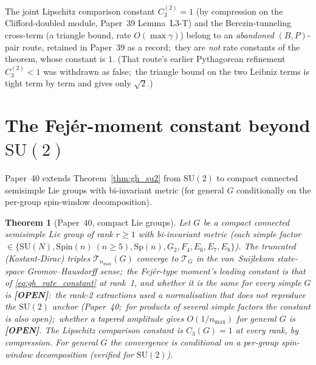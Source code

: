 \documentclass[11pt,a4paper]{article}
\theoremstyle{plain}
\newtheorem{theorem}{Theorem}[section]
\theoremstyle{definition}
\newcommand{\nmax}{n_{\max}}
\newcommand{\Tcal}{\mathcal{T}}
\newcommand{\SU}{\mathrm{SU}}
\newcommand{\gvc}[2]{#2}
\begin{document}
\gvc{lipschitz-c3-compression}{The joint Lipschitz comparison constant $C_3^{(2)} = 1$ (by compression on
the Clifford-doubled module, Paper~39 Lemma~L3-T) and the
Berezin-tunneling cross-term (a triangle bound, rate $O(\max\gamma)$)
belong to an \emph{abandoned} $(B,P)$-pair route, retained in Paper~39 as
a record;\ they are \emph{not} rate constants of the theorem, whose
constant is $1$}. (That route's earlier Pythagorean refinement
$C_3^{(2)}<1$ was withdrawn as false;\ the triangle bound on the two
Leibniz terms is tight term by term and gives only $\sqrt 2$.)

\section{The Fej\'er-moment constant beyond $\SU(2)$}
\label{sec:universality}

\gvc{p40-general-g-conditional}{Paper~40 \cite{paper40_unified} extends Theorem~\ref{thm:gh_su2}
from $\SU(2)$ to compact connected semisimple Lie groups with
bi-invariant metric (for general $G$ conditionally on the per-group
spin-window decomposition)}.

\begin{theorem}[Paper~40, compact Lie groups]
\label{thm:universal_rate}
Let $G$ be a compact connected semisimple Lie group of rank $r \ge 1$
with bi-invariant metric (each simple factor
$\in \{\SU(N), \mathrm{Spin}(n)\ (n \ge 5), \mathrm{Sp}(n), G_{2}, F_{4},
E_{6}, E_{7}, E_{8}\}$).  The truncated (Kostant-Dirac) triples
$\Tcal_{\nmax}(G)$ converge to $\Tcal_{G}$ in the van~Suijlekom
state-space Gromov--Hausdorff sense;\ \gvc{p40-general-g-conditional}{the Fej\'er-type
moment's leading constant is that of \eqref{eq:gh_rate_constant} at rank~1, and whether it is
the same for every simple $G$ is \textbf{[OPEN]}:\ the rank-2 extractions used a
normalisation that does not reproduce the $\SU(2)$ anchor (Paper~40;\ for products of
several simple factors the constant is also open)};\ whether a tapered amplitude gives $O(1/\nmax)$ for general
$G$ is \textbf{[OPEN]}.  \gvc{lipschitz-c3-compression}{The Lipschitz comparison constant is $C_{3}(G) = 1$ at every
rank, by compression}.  For general $G$ the convergence is conditional on a
per-group spin-window decomposition (verified for $\SU(2)$).
\end{theorem}
\end{document}

